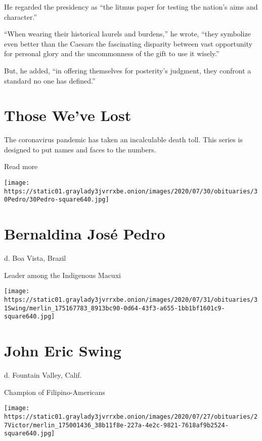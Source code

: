 He regarded the presidency as ``the litmus paper for testing the
nation's aims and character.''

``When wearing their historical laurels and burdens,'' he wrote, ``they
symbolize even better than the Caesars the fascinating disparity between
vast opportunity for personal glory and the uncommonness of the gift to
use it wisely.''

But, he added, ``in offering themselves for posterity's judgment, they
confront a standard no one has defined.''

\href{https://www.nytimes3xbfgragh.onion/interactive/2020/obituaries/people-died-coronavirus-obituaries.html?action=click\&pgtype=Article\&state=default\&region=BELOW_MAIN_CONTENT\&context=covid_obits_promo}{}

\hypertarget{those-weve-lost}{%
\section{Those We've Lost}\label{those-weve-lost}}

The coronavirus pandemic has taken an incalculable death toll. This
series is designed to put names and faces to the numbers.

Read more

\texttt{[image: https://static01.graylady3jvrrxbe.onion/images/2020/07/30/obituaries/30Pedro/30Pedro-square640.jpg]}

\hypertarget{bernaldina-josuxe9-pedro}{%
\section{Bernaldina José Pedro}\label{bernaldina-josuxe9-pedro}}

d. Boa Vista, Brazil

Leader among the Indigenous Macuxi

\texttt{[image: https://static01.graylady3jvrrxbe.onion/images/2020/07/31/obituaries/31Swing/merlin\_175167783\_8913bc90-0d64-43f3-a655-1bb1bf1601c9-square640.jpg]}

\hypertarget{john-eric-swing}{%
\section{John Eric Swing}\label{john-eric-swing}}

d. Fountain Valley, Calif.

Champion of Filipino-Americans

\texttt{[image: https://static01.graylady3jvrrxbe.onion/images/2020/07/27/obituaries/27Victor/merlin\_175001436\_38b11f8e-227a-4e2c-9821-7618af9b2524-square640.jpg]}

